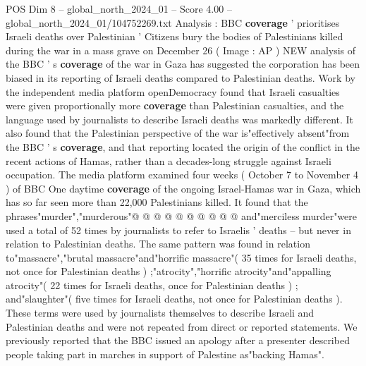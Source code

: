 \begin{textsample}{POS Dim 8 – global\_north\_2024\_01 – Score 4.00 – global\_north\_2024\_01/104752269.txt}  \label{ex:f8_pos_235}
Analysis : BBC \textbf{coverage} ' prioritises Israeli deaths over Palestinian ' Citizens bury the bodies of Palestinians killed during the war in a mass grave on December 26 ( Image : AP ) NEW analysis of the BBC ' s \textbf{coverage} of the war in Gaza has suggested the corporation has been biased in its reporting of Israeli deaths compared to Palestinian deaths.
Work by the independent media platform openDemocracy found that Israeli casualties were given proportionally more \textbf{coverage} than Palestinian casualties, and the language used by journalists to describe Israeli deaths was markedly different.
It also found that the Palestinian perspective of the war is"effectively absent"from the BBC ' s \textbf{coverage}, and that reporting located the origin of the conflict in the recent actions of Hamas, rather than a decades-long struggle against Israeli occupation.
The media platform examined four weeks ( October 7 to November 4 ) of BBC One daytime \textbf{coverage} of the ongoing Israel-Hamas war in Gaza, which has so far seen more than 22,000 Palestinians killed.
It found that the phrases"murder","murderous"@ @ @ @ @ @ @ @ @ @ and"merciless murder"were used a total of 52 times by journalists to refer to Israelis ' deaths -- but never in relation to Palestinian deaths.
The same pattern was found in relation to"massacre","brutal massacre"and"horrific massacre"( 35 times for Israeli deaths, not once for Palestinian deaths ) ;"atrocity","horrific atrocity"and"appalling atrocity"( 22 times for Israeli deaths, once for Palestinian deaths ) ; and"slaughter"( five times for Israeli deaths, not once for Palestinian deaths ).
These terms were used by journalists themselves to describe Israeli and Palestinian deaths and were not repeated from direct or reported statements.
We previously reported that the BBC issued an apology after a presenter described people taking part in marches in support of Palestine as"backing Hamas".

\end{textsample}
